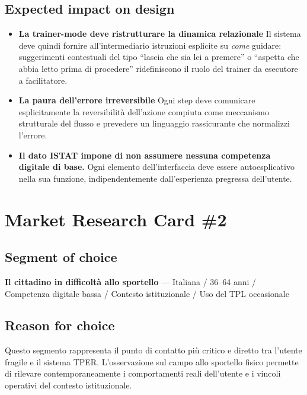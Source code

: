 \documentclass[11pt,a4paper]{article}
\begin{document}
\subsection*{Expected impact on design}
\begin{tcolorbox}[colback=backgroundColor,colframe=borderColor,arc=2mm]

\begin{itemize}[leftmargin=*,itemsep=6pt]

    \item \textbf{La trainer-mode deve ristrutturare la dinamica relazionale} Il sistema deve quindi 
    fornire all'intermediario istruzioni esplicite su \textit{come} guidare: 
    suggerimenti contestuali del tipo ``lascia che sia lei a premere'' o 
    ``aspetta che abbia letto prima di procedere'' ridefiniscono il ruolo 
    del trainer da esecutore a facilitatore.

    \item \textbf{La paura dell'errore irreversibile} Ogni step deve comunicare 
    esplicitamente la reversibilità dell'azione compiuta come meccanismo strutturale del flusso e 
    prevedere un linguaggio rassicurante che normalizzi l'errore.

    \item \textbf{Il dato ISTAT impone di non assumere nessuna competenza 
    digitale di base.} Ogni elemento 
    dell'interfaccia deve essere autoesplicativo nella sua funzione, 
    indipendentemente dall'esperienza pregressa dell'utente.

\end{itemize}
\end{tcolorbox}

\newpage 

\newpage
\section*{Market Research Card \#2}

\subsection*{Segment of choice}
\begin{tcolorbox}[colback=backgroundColor,colframe=borderColor,arc=2mm]
\textbf{Il cittadino in difficoltà allo sportello} --- Italiana / 36--64 anni / Competenza digitale bassa / Contesto istituzionale / Uso del TPL occasionale
\end{tcolorbox}

\subsection*{Reason for choice}
\begin{tcolorbox}[colback=backgroundColor,colframe=borderColor,arc=2mm]
Questo segmento rappresenta il punto di contatto più critico e diretto tra l'utente fragile e il sistema TPER. L'osservazione sul campo allo sportello fisico permette di rilevare contemporaneamente i comportamenti reali dell'utente e i vincoli operativi del contesto istituzionale.
\end{tcolorbox}
\end{document}
